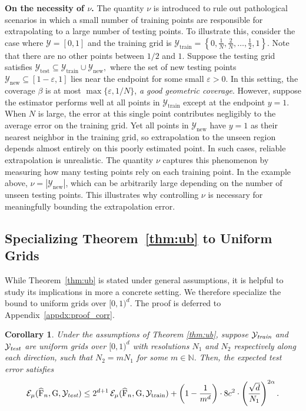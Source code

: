 \documentclass[11pt]{article}
\theoremstyle{plain}
\newtheorem{corollary}{Corollary}
\newcommand{\naturals}{\mathbb{N}}
\newcommand{\Ycal}{\mathcal{Y}}
\begin{document}




\vspace{0.3cm}
\noindent \textbf{On the necessity of $\nu$.} The quantity $\nu$ is introduced to rule out pathological scenarios in which a small number of
training points are responsible for extrapolating to a large number of testing points.
To illustrate this, consider the case where $\Ycal = [0,1]$ and the training grid is $
\Ycal_{\mathrm{train}} = \left\{ 0, \tfrac{1}{N}, \tfrac{2}{N}, \ldots, \tfrac{1}{2}, 1 \right\}$. Note that there are no other points between $1/2$ and $1$.
Suppose the testing grid satisfies $
\Ycal_{\mathrm{test}} \subseteq \Ycal_{\mathrm{train}} \cup \Ycal_{\mathrm{new}},$
where the set of new testing points $\Ycal_{\mathrm{new}} \subseteq [1-\varepsilon, 1]$ lies near
the endpoint for some small $\varepsilon > 0$. In this setting, the coverage $\beta$ is at most $\max\{\varepsilon, 1/N\}$, \emph{a good geometric
coverage}. However, suppose the estimator performs well at all points in $\Ycal_{\mathrm{train}}$ except at
the endpoint $y = 1$. When $N$ is large, the error at this single point contributes negligibly to
the average error on the training grid. Yet all points in $\Ycal_{\mathrm{new}}$ have $y = 1$ as their nearest
neighbor in the training grid, so extrapolation to the unseen region depends almost entirely on
this poorly estimated point. In such cases, reliable extrapolation is unrealistic. The quantity
$\nu$ captures this phenomenon by measuring how many testing points rely on each training point.
In the example above, $\nu = |\Ycal_{\mathrm{new}}|$, which can be arbitrarily large depending on
the number of unseen testing points. This illustrates why controlling $\nu$ is necessary for
meaningfully bounding the extrapolation error.


\subsection{Specializing Theorem~\ref{thm:ub} to Uniform Grids}

While Theorem~\ref{thm:ub} is stated under general assumptions, it is helpful to study its implications in more a concrete setting. We therefore specialize the bound to uniform grids over $[0,1)^d$. The proof is deferred to Appendix~\ref{appdx:proof_corr}.

\begin{corollary}
\label{cor:uniform} 
Under the assumptions of Theorem \ref{thm:ub}, suppose $ \Ycal_{\emph{train}} $ and $ \Ycal_{\emph{test}} $ are uniform grids over $ [0,1)^d $ with resolutions $ N_1 $ and $ N_2 $ respectively along each direction, such that $N_2 = m N_1$ for some $m \in \naturals$.
Then, the expected test error satisfies
\[
\mathcal{E}_{\mu}(\widehat{\operatorname{F}}_n, \operatorname{G}, \Ycal_{\emph{test}}) \leq 2^{d+1}\, \mathcal{E}_\mu(\widehat{\operatorname{F}}_n, \operatorname{G}, \Ycal_{\mathrm{train}}) + \left( 1-\frac{1}{m^d}\right) \cdot 8c^2\cdot  \left(\frac{\sqrt{d}}{N_1} \right)^{2\alpha}.
\]
\end{corollary}
\end{document}
